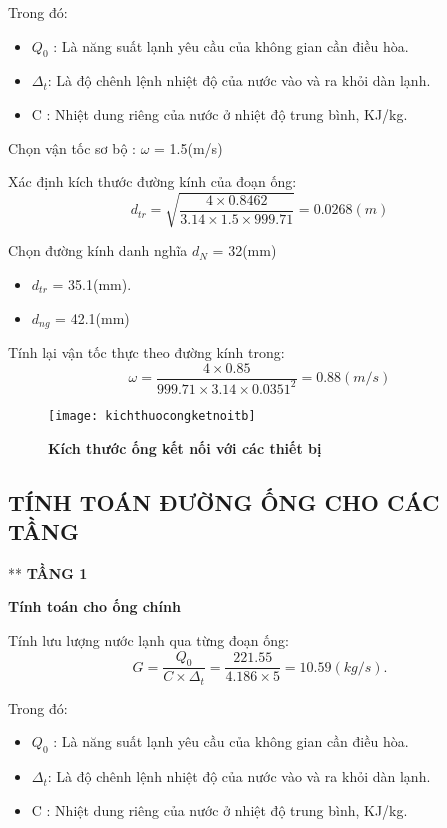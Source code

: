 Trong đó:
\begin{itemize}
	\item $Q_{0}$ : Là năng suất lạnh yêu cầu của không gian cần điều hòa.
	\item $\Delta_{t}$: Là độ chênh lệnh nhiệt độ của nước vào và ra khỏi dàn lạnh.
	\item C : Nhiệt dung riêng của nước ở nhiệt độ trung bình, KJ/kg.
\end{itemize}

Chọn vận tốc sơ bộ : $\omega$ = 1.5(m/s)

Xác định kích thước đường kính của đoạn ống:
\begin{equation*}
	d_{tr} = \sqrt{\dfrac{4 \times 0.8462}{3.14 \times 1.5 \times 999.71}} = 0.0268(m)
\end{equation*}

Chọn đường kính danh nghĩa $d_{N}$ = 32(mm)
\begin{itemize}
	\item $d_{tr}$ = 35.1(mm).
	\item $d_{ng}$ = 42.1(mm)
\end{itemize}

Tính lại vận tốc thực theo đường kính trong:
\begin{equation*}
	\omega = \dfrac{4 \times 0.85 }{999.71 \times 3.14 \times 0.0351^{2}} = 0.88(m/s)
\end{equation*}

\begin{figure}[H]
	\centering
	\texttt{[image: kichthuocongketnoitb]}
	\caption{\textbf{Kích thước ống kết nối với các thiết bị}}
	\label{kichthuocongketnoitb}	 
\end{figure}

\subsection{TÍNH TOÁN ĐƯỜNG ỐNG CHO CÁC TẦNG}
** \textbf{TẦNG 1}

\textbf{Tính toán cho ống chính}

Tính lưu lượng nước lạnh qua từng đoạn ống:
\begin{equation*}
	G = \dfrac{Q_{0}}{C \times \Delta_{t}} =\dfrac{221.55}{4.186 \times 5} = 10.59(kg/s).
\end{equation*}

Trong đó:
\begin{itemize}
	\item $Q_{0}$ : Là năng suất lạnh yêu cầu của không gian cần điều hòa.
	\item $\Delta_{t}$: Là độ chênh lệnh nhiệt độ của nước vào và ra khỏi dàn lạnh.
	\item C : Nhiệt dung riêng của nước ở nhiệt độ trung bình, KJ/kg.
\end{itemize}

